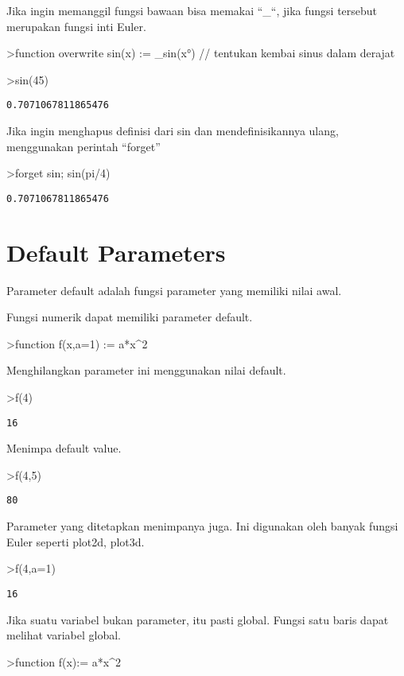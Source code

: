 \documentclass[
]{book}
\begin{document}
Jika ingin memanggil fungsi bawaan bisa memakai ``\_``, jika fungsi tersebut merupakan fungsi inti Euler.

\textgreater function overwrite sin(x) := \_sin(x°) // tentukan kembai sinus dalam derajat

\textgreater sin(45)

\begin{verbatim}
0.7071067811865476
\end{verbatim}

Jika ingin menghapus definisi dari sin dan mendefinisikannya ulang, menggunakan perintah ``forget''

\textgreater forget sin; sin(pi/4)

\begin{verbatim}
0.7071067811865476
\end{verbatim}

\section{Default Parameters}\label{default-parameters}

Parameter default adalah fungsi parameter yang memiliki nilai awal.

Fungsi numerik dapat memiliki parameter default.

\textgreater function f(x,a=1) := a*x\^{}2

Menghilangkan parameter ini menggunakan nilai default.

\textgreater f(4)

\begin{verbatim}
16
\end{verbatim}

Menimpa default value.

\textgreater f(4,5)

\begin{verbatim}
80
\end{verbatim}

Parameter yang ditetapkan menimpanya juga. Ini digunakan oleh banyak fungsi Euler seperti plot2d, plot3d.

\textgreater f(4,a=1)

\begin{verbatim}
16
\end{verbatim}

Jika suatu variabel bukan parameter, itu pasti global. Fungsi satu baris dapat melihat variabel global.

\textgreater function f(x):= a*x\^{}2
\end{document}
